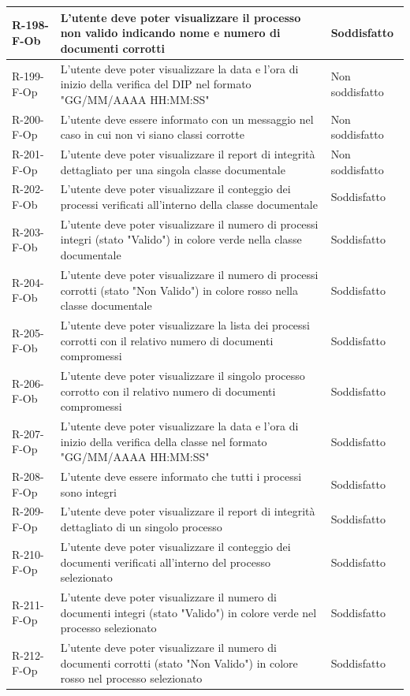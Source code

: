 \begin{longtable}{|p{2.5cm}|p{9.5cm}|p{2.5cm}|}
\hline
R-198-F-Ob & L'utente deve poter visualizzare il processo non valido indicando nome e numero di documenti corrotti & Soddisfatto \\
\hline
R-199-F-Op & L'utente deve poter visualizzare la data e l'ora di inizio della verifica del DIP nel formato "GG/MM/AAAA HH:MM:SS" & Non soddisfatto \\
\hline
R-200-F-Op & L'utente deve essere informato con un messaggio nel caso in cui non vi siano classi corrotte & Non soddisfatto \\
\hline
R-201-F-Op & L'utente deve poter visualizzare il report di integrità dettagliato per una singola classe documentale & Non soddisfatto \\
\hline
R-202-F-Ob & L'utente deve poter visualizzare il conteggio dei processi verificati all'interno della classe documentale & Soddisfatto \\
\hline
R-203-F-Ob & L'utente deve poter visualizzare il numero di processi integri (stato "Valido") in colore verde nella classe documentale & Soddisfatto \\
\hline
R-204-F-Ob & L'utente deve poter visualizzare il numero di processi corrotti (stato "Non Valido") in colore rosso nella classe documentale & Soddisfatto \\
\hline
R-205-F-Ob & L'utente deve poter visualizzare la lista dei processi corrotti con il relativo numero di documenti compromessi & Soddisfatto \\
\hline
R-206-F-Ob & L'utente deve poter visualizzare il singolo processo corrotto con il relativo numero di documenti compromessi & Soddisfatto \\
\hline
R-207-F-Op & L'utente deve poter visualizzare la data e l'ora di inizio della verifica della classe nel formato "GG/MM/AAAA HH:MM:SS" & Soddisfatto \\
\hline
R-208-F-Op & L'utente deve essere informato che tutti i processi sono integri & Soddisfatto \\
\hline
R-209-F-Op & L'utente deve poter visualizzare il report di integrità dettagliato di un singolo processo & Soddisfatto \\
\hline
R-210-F-Op & L'utente deve poter visualizzare il conteggio dei documenti verificati all'interno del processo selezionato & Soddisfatto \\
\hline
R-211-F-Op & L'utente deve poter visualizzare il numero di documenti integri (stato "Valido") in colore verde nel processo selezionato & Soddisfatto \\
\hline
R-212-F-Op & L'utente deve poter visualizzare il numero di documenti corrotti (stato "Non Valido") in colore rosso nel processo selezionato & Soddisfatto \\

\end{longtable}
